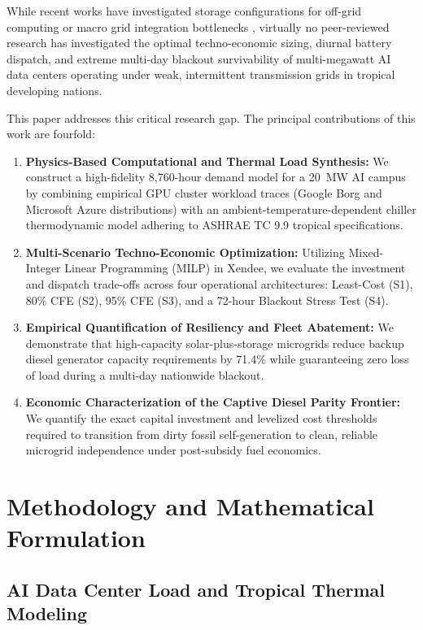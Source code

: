 \documentclass[12pt,3p,review]{elsarticle}
\begin{document}
While recent works have investigated storage configurations for off-grid computing \cite{Hong2024} or macro grid integration bottlenecks \cite{Chen2024Grid}, virtually no peer-reviewed research has investigated the optimal techno-economic sizing, diurnal battery dispatch, and extreme multi-day blackout survivability of multi-megawatt AI data centers operating under weak, intermittent transmission grids in tropical developing nations.

This paper addresses this critical research gap. The principal contributions of this work are fourfold:
\begin{enumerate}
    \item \textbf{Physics-Based Computational and Thermal Load Synthesis:} We construct a high-fidelity 8,760-hour demand model for a 20~MW AI campus by combining empirical GPU cluster workload traces (Google Borg and Microsoft Azure distributions) with an ambient-temperature-dependent chiller thermodynamic model adhering to ASHRAE TC 9.9 tropical specifications.
    \item \textbf{Multi-Scenario Techno-Economic Optimization:} Utilizing Mixed-Integer Linear Programming (MILP) in Xendee, we evaluate the investment and dispatch trade-offs across four operational architectures: Least-Cost (S1), 80\% CFE (S2), 95\% CFE (S3), and a 72-hour Blackout Stress Test (S4).
    \item \textbf{Empirical Quantification of Resiliency and Fleet Abatement:} We demonstrate that high-capacity solar-plus-storage microgrids reduce backup diesel generator capacity requirements by 71.4\% while guaranteeing zero loss of load during a multi-day nationwide blackout.
    \item \textbf{Economic Characterization of the Captive Diesel Parity Frontier:} We quantify the exact capital investment and levelized cost thresholds required to transition from dirty fossil self-generation to clean, reliable microgrid independence under post-subsidy fuel economics.
\end{enumerate}

\section{Methodology and Mathematical Formulation}
\label{sec:method}

\subsection{AI Data Center Load and Tropical Thermal Modeling}
\end{document}
